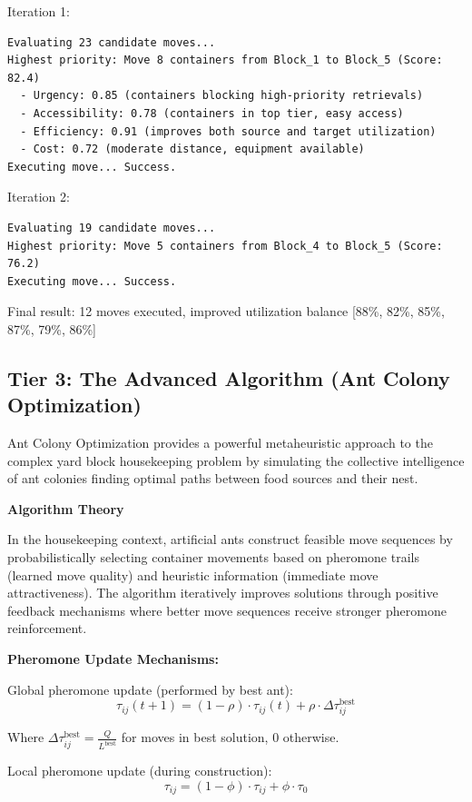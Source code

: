 \documentclass{article}
\begin{document}
Iteration 1:
\begin{verbatim}
Evaluating 23 candidate moves...
Highest priority: Move 8 containers from Block_1 to Block_5 (Score: 82.4)
  - Urgency: 0.85 (containers blocking high-priority retrievals)
  - Accessibility: 0.78 (containers in top tier, easy access)
  - Efficiency: 0.91 (improves both source and target utilization)
  - Cost: 0.72 (moderate distance, equipment available)
Executing move... Success.
\end{verbatim}

Iteration 2:
\begin{verbatim}
Evaluating 19 candidate moves...
Highest priority: Move 5 containers from Block_4 to Block_5 (Score: 76.2)
Executing move... Success.
\end{verbatim}

Final result: 12 moves executed, improved utilization balance [88\%, 82\%, 85\%, 87\%, 79\%, 86\%]

\subsection{Tier 3: The Advanced Algorithm (Ant Colony Optimization)}

Ant Colony Optimization provides a powerful metaheuristic approach to the complex yard block housekeeping problem by simulating the collective intelligence of ant colonies finding optimal paths between food sources and their nest.

\textbf{Algorithm Theory}

In the housekeeping context, artificial ants construct feasible move sequences by probabilistically selecting container movements based on pheromone trails (learned move quality) and heuristic information (immediate move attractiveness). The algorithm iteratively improves solutions through positive feedback mechanisms where better move sequences receive stronger pheromone reinforcement.

\textbf{Pheromone Update Mechanisms:}

Global pheromone update (performed by best ant):
\begin{equation}
\tau_{ij}(t+1) = (1-\rho) \cdot \tau_{ij}(t) + \rho \cdot \Delta\tau_{ij}^{\text{best}}
\end{equation}

Where $\Delta\tau_{ij}^{\text{best}} = \frac{Q}{L^{\text{best}}}$ for moves in best solution, 0 otherwise.

Local pheromone update (during construction):
\begin{equation}
\tau_{ij} = (1-\phi) \cdot \tau_{ij} + \phi \cdot \tau_0
\end{equation}
\end{document}
